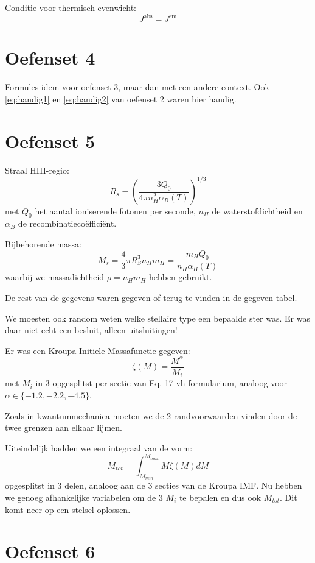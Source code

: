 \documentclass[a4paper,twoside]{article}
\theoremstyle{definition}
\theoremstyle{plain}
\begin{document}
Conditie voor thermisch evenwicht:
\begin{equation}
    J^\text{abs} = J^\text{em}
\end{equation}  

\section{Oefenset 4}

Formules idem voor oefenset 3, maar dan met een andere context.
Ook \eqref{eq:handig1} en \eqref{eq:handig2} van oefenset 2 waren hier handig.


\section{Oefenset 5}

Straal HIII-regio:
\begin{equation}
    R_s = \left( \frac{3 Q_0}{4 \pi n_H^2 \alpha_B (T)} \right)^{1/3}
\end{equation}  
met \(Q_0\) het aantal ioniserende fotonen per seconde, \(n_H\) de waterstofdichtheid en \(\alpha_B\) de recombinatiecoëfficiënt.

Bijbehorende massa:
\begin{equation}
    M_s = \frac{4}{3} \pi R_S^3 n_H m_H = \frac{m_H Q_0}{n_H \alpha_B (T)}
\end{equation}
waarbij we massadichtheid \(\rho = n_H m_H\) hebben gebruikt.

De rest van de gegevens waren gegeven of terug te vinden in de gegeven tabel.

We moesten ook random weten welke stellaire type een bepaalde ster was.
Er was daar niet echt een besluit, alleen uitsluitingen!

Er was een Kroupa Initiele Massafunctie gegeven:
\[
\zeta (M) = \frac{M^\alpha}{M_i}
\]
met \(M_i\) in 3 opgesplitst per sectie van Eq. 17 vh formularium, analoog voor \(\alpha \in \{-1.2, -2.2, -4.5\}\).

Zoals in kwantummechanica moeten we de 2 randvoorwaarden vinden door de twee grenzen aan elkaar lijmen.

Uiteindelijk hadden we een integraal van de vorm:
\[
M_{tot} = \int_{M_{min}}^{M_{max}}  M \zeta (M) dM
\]
opgesplitst in 3 delen, analoog aan de 3 secties van de Kroupa IMF.
Nu hebben we genoeg afhankelijke variabelen om de 3 \(M_i\) te bepalen en dus ook \(M_{tot}\).
Dit komt neer op een stelsel oplossen.
\section{Oefenset 6}
\end{document}

